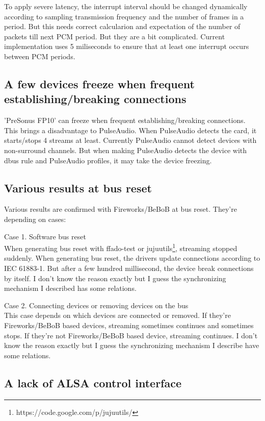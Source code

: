 \documentclass[onecolumn]{article}
\begin{document}
To apply severe latency, the interrupt interval should be changed dynamically according to sampling transmission frequency and the number of frames in a period. But this needs correct calcularion and expectation of the number of packets till next PCM period. But they are a bit complicated. Current implementation uses 5 miliseconds to ensure that at least one interrupt occurs between PCM periods.


\subsection{A few devices freeze when frequent establishing/breaking connections}
'PreSonus FP10' can freeze when frequent establishing/breaking connections. This brings a disadvantage to PulseAudio. When PulseAudio detects the card, it starts/stops 4 streams at least. Currently PulseAudio cannot detect devices with non-surround channels. But when making PulseAudio detects the device with dbus rule and PulseAudio profiles, it may take the device freezing.

\subsection{Various results at bus reset}
Various results are confirmed with Fireworks/BeBoB at bus reset. They're depending on cases:
\begin{description}
\item{Case 1. Software bus reset} \mbox{} \\
When generating bus reset with ffado-test or jujuutils\footnote{https://code.google.com/p/jujuutils/}, streaming stopped suddenly. When generating bus reset, the drivers update connections according to IEC 61883-1. But after a few hundred millisecond, the device break connections by itself. I don't know the reason exactly but I guess the synchronizing mechanism I described has some relations.
\item{Case 2. Connecting devices or removing devices on the bus} \mbox{} \\
This case depends on which devices are connected or removed. If they're Fireworks/BeBoB based devices, streaming sometimes continues and sometimes stops. If they're not Fireworks/BeBoB based device, streaming continues. I don't know the reason exactly but I guess the synchronizing mechanism I describe have some relations. 
\end{description}

\subsection{A lack of ALSA control interface}
\end{document}
